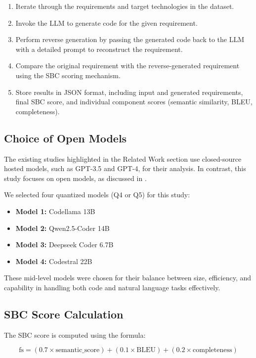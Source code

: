 \documentclass{article}
\begin{document}
\begin{enumerate}
    \item Iterate through the requirements and target technologies in the dataset.
    \item Invoke the LLM to generate code for the given requirement.
    \item Perform reverse generation by passing the generated code back to the LLM with a detailed prompt to reconstruct the requirement.
    \item Compare the original requirement with the reverse-generated requirement using the SBC scoring mechanism.
    \item Store results in JSON format, including input and generated requirements, final SBC score, and individual component scores (semantic similarity, BLEU, completeness).
\end{enumerate}

\subsection{Choice of Open Models}

The existing studies highlighted in the Related Work section \cite{yang2023geval, terry2024icescore} use closed-source hosted models, such as GPT-3.5 and GPT-4, for their analysis. In contrast, this study focuses on open models, as discussed in \cite{white2024mof}. 

We selected four quantized models (Q4 or Q5) for this study:

\begin{itemize}
    \item \textbf{Model 1:} Codellama 13B
    \item \textbf{Model 2:} Qwen2.5-Coder 14B
    \item \textbf{Model 3:} Deepseek Coder 6.7B
    \item \textbf{Model 4:} Codestral 22B
\end{itemize}

These mid-level models were chosen for their balance between size, efficiency, and capability in handling both code and natural language tasks effectively.

\subsection{SBC Score Calculation}

The SBC score is computed using the formula:

\begin{equation}
\text{fs} = (0.7 \times \text{semantic\_score}) + (0.1 \times \text{BLEU}) + (0.2 \times \text{completeness})
\end{equation}
\end{document}

